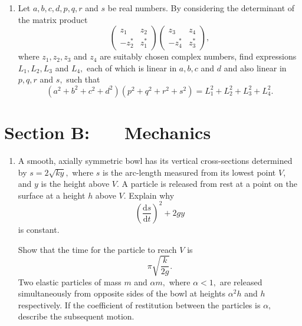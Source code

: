 \documentclass[a4, 11pt]{report}
\newlength{\qspace}
\newcounter{qnumber}
\newenvironment{question}%
 {\vspace{\qspace}
  \begin{enumerate}[\bfseries 1\quad][10]%
    \setcounter{enumi}{\value{qnumber}}%
    \item%
 }
{
  \end{enumerate}
  \filbreak
  \stepcounter{qnumber}
 }
\begin{document}
\begin{question}	
Let $a,b,c,d,p,q,r$ and $s$ be real numbers. By considering the
determinant of the matrix product 
\[
\begin{pmatrix}z_{1} & z_{2}\\
-z_{2}^{*} & z_{1}^{*}
\end{pmatrix}\begin{pmatrix}z_{3} & z_{4}\\
-z_{4}^{*} & z_{3}^{*}
\end{pmatrix},
\]
where $z_{1},z_{2},z_{3}$ and $z_{4}$ are suitably chosen complex
numbers, find expressions $L_{1},L_{2},L_{3}$ and $L_{4},$ each
of which is linear in $a,b,c$ and $d$ and also linear in $p,q,r$
and $s,$ such that 
\[
(a^{2}+b^{2}+c^{2}+d^{2})(p^{2}+q^{2}+r^{2}+s^{2})=L_{1}^{2}+L_{2}^{2}+L_{3}^{2}+L_{4}^{2}.
\]
\end{question}	
		

		
	
\newpage
\section*{Section B: \ \ \ Mechanics}


	
\begin{question}
A smooth, axially symmetric bowl has its vertical cross-sections determined
by $s=2\sqrt{ky},$ where $s$ is the arc-length measured from its
lowest point $V$, and $y$ is the height above $V$. A particle is
released from rest at a point on the surface at a height $h$ above
$V$. Explain why 
\[
\left(\frac{\mathrm{d}s}{\mathrm{d}t}\right)^{2}+2gy
\]
is constant. 


Show that the time for the particle to reach $V$ is 
\[
\pi\sqrt{\frac{k}{2g}}.
\]
Two elastic particles of mass $m$ and $\alpha m,$ where $\alpha<1,$
are released simultaneously from opposite sides of the bowl at heights
$\alpha^{2}h$ and $h$ respectively. If the coefficient of restitution
between the particles is $\alpha,$ describe the subsequent motion. 
	\end{question}
	
\end{document}
